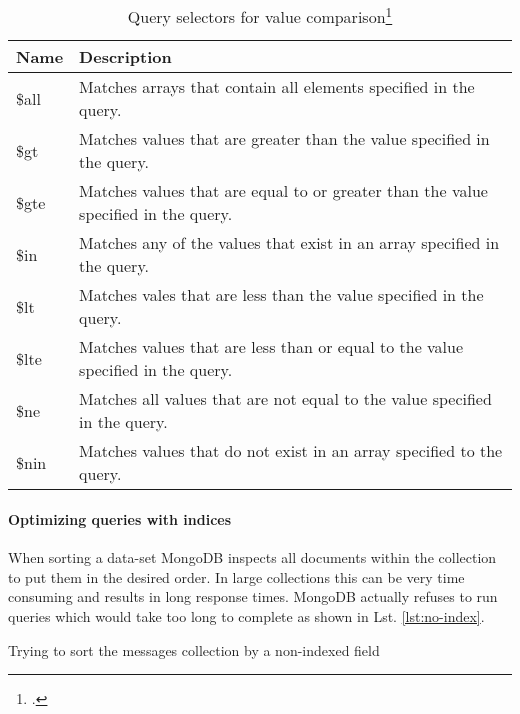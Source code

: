 \begin{savenotes}
\begin{table}[htbp]
\begin{tabular*}{\textwidth}{p{} p{}}
\toprule
\textbf{Name} 					& \textbf{Description}\\
\midrule 
\$all    & Matches arrays that contain all elements specified in the query. \\
\$gt     & Matches values that are greater than the value specified in the query.\\
\$gte    & Matches values that are equal to or greater than the value specified in the query.\\
\$in     & Matches any of the values that exist in an array specified in the query.\\
\$lt     & Matches vales that are less than the value specified in the query.\\
\$lte    & Matches values that are less than or equal to the value specified in the query.\\
\$ne     & Matches all values that are not equal to the value specified in the query.\\
\$nin    & Matches values that do not exist in an array specified to the query.\\
\bottomrule 
\end{tabular*}
  \caption[Query selectors for value comparison]{Query selectors for value comparison\footcite[][]{mongo_query_ops}}
  \label{tab:query-selectors-compare}
\end{table}
\end{savenotes}


\paragraph{Optimizing queries with indices}
When sorting a data-set MongoDB inspects all documents within the collection
to put them in the desired order. In large collections this can be very time
consuming and results in long response times.
MongoDB actually refuses to run queries which would take too long to complete as shown in
Lst. \ref{lst:no-index}.

\begin{listing}
    \caption{Trying to sort the messages collection by a non-indexed field}
    \label{lst:no-index}
\end{listing}

